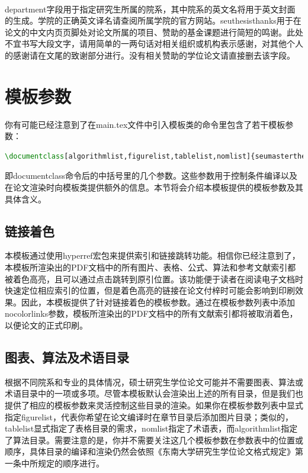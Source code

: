 ~

{\codefont department}字段用于指定研究生所属的院系，其中院系的英文名将用于英文封面的生成。学院的正确英文译名请查阅所属学院的官方网站。{\codefont seuthesisthanks}用于在论文的中文内页页脚处对论文所属的项目、赞助的基金课题进行简短的鸣谢。此处不宜书写大段文字，请用简单的一两句话对相关组织或机构表示感谢，对其他个人的感谢请在文尾的致谢部分进行。没有相关赞助的学位论文请直接删去该字段。

\section{模板参数}

你有可能已经注意到了在main.tex文件中引入模板类的命令里包含了若干模板参数：

\begin{tcolorbox}
\begin{lstlisting}[language=TeX]
\documentclass[algorithmlist,figurelist,tablelist,nomlist]{seumasterthesis}
\end{lstlisting}
\end{tcolorbox}

\noindent 即{\codefont documentclass}命令后的中括号里的几个参数。这些参数用于控制条件编译以及在论文渲染时向模板类提供额外的信息。本节将会介绍本模板提供的模板参数及其具体含义。

\subsection{链接着色}

本模板通过使用hyperref宏包来提供索引和链接跳转功能。相信你已经注意到了，本模板所渲染出的PDF文档中的所有图片、表格、公式、算法和参考文献索引都被着色高亮，且可以通过点击跳转到原引位置。该功能便于读者在阅读电子文档时快速定位相应索引的位置，但是着色高亮的链接在论文付梓时可能会影响到印刷效果。因此，本模板提供了针对链接着色的模板参数。通过在模板参数列表中添加{\codefont nocolorlinks}参数，模板所渲染出的PDF文档中的所有文献索引都将被取消着色，以便论文的正式印刷。

\subsection{图表、算法及术语目录}

根据不同院系和专业的具体情况，硕士研究生学位论文可能并不需要图表、算法或术语目录中的一项或多项。尽管本模板默认会渲染出上述的所有目录，但是我们也提供了相应的模板参数来灵活控制这些目录的渲染。如果你在模板参数列表中显式指定{\codefont figurelist}，代表你希望在论文编译时在章节目录后添加图片目录；类似的，{\codefont tablelist}显式指定了表格目录的需求，{\codefont nomlist}指定了术语表，而{\codefont algorithmlist}指定了算法目录。需要注意的是，你并不需要关注这几个模板参数在参数表中的位置或顺序，具体目录的编译和渲染仍然会依照《东南大学研究生学位论文格式规定》\cite{seugs2015rule}第一条中所规定的顺序进行。